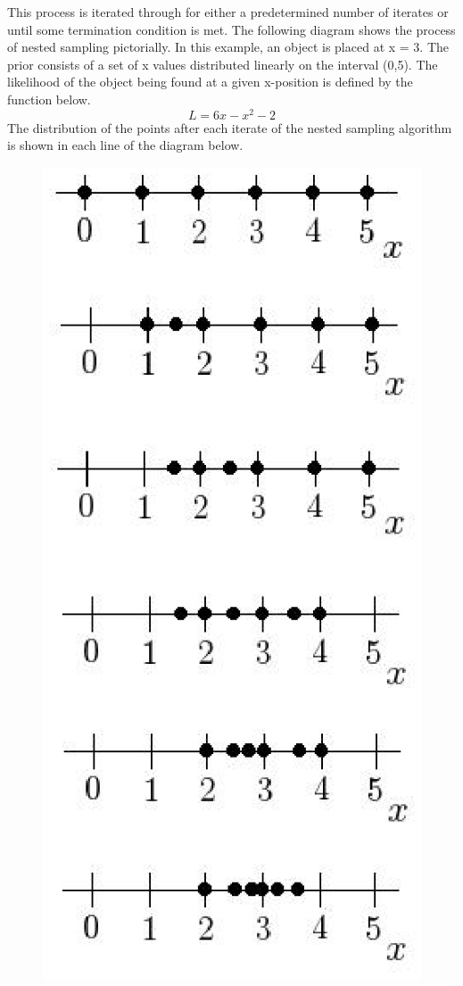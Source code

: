 \documentclass[a4paper,12pt]{article}
\begin{document}
\newline
This process is iterated through for either a predetermined number of iterates or until some termination condition is met.\cite{skilling,sivia}
\newline
The following diagram shows the process of nested sampling pictorially.  In this example, an object is placed at x = 3.  The prior consists of a set of x values distributed linearly on the interval (0,5).  The likelihood of the object being found at a given x-position is defined by the function below.
\begin{equation}
 L = 6x - x^{2} - 2
\end{equation}
The distribution of the points after each iterate of the nested sampling algorithm is shown in each line of the diagram below.


\begin{figure}[!h]
 \begin{center}
  \includegraphics[scale=0.75]{nsdiagram.eps}

\end{center}
\end{figure}
\end{document}
